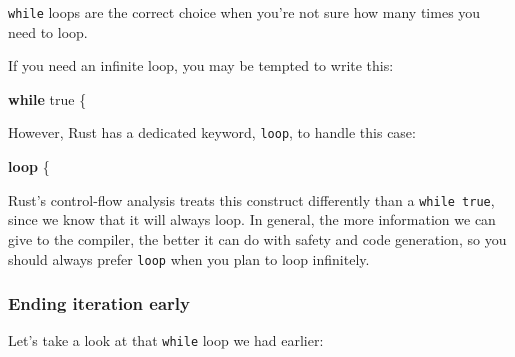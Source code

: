 \documentclass[a4paper,]{book}
\newenvironment{Shaded}{\begin{snugshade}}{\end{snugshade}}
\newcommand{\KeywordTok}[1]{\textcolor[rgb]{0.13,0.29,0.53}{\textbf{{#1}}}}
\newcommand{\DecValTok}[1]{\textcolor[rgb]{0.00,0.00,0.81}{{#1}}}
\newcommand{\ConstantTok}[1]{\textcolor[rgb]{0.00,0.00,0.00}{{#1}}}
\newcommand{\StringTok}[1]{\textcolor[rgb]{0.31,0.60,0.02}{{#1}}}
\newcommand{\PreprocessorTok}[1]{\textcolor[rgb]{0.56,0.35,0.01}{\textit{{#1}}}}
\newcommand{\NormalTok}[1]{{#1}}
\begin{document}
\texttt{while} loops are the correct choice when you're not sure how
many times you need to loop.

If you need an infinite loop, you may be tempted to write this:

\begin{Shaded}
\begin{Highlighting}[]
\KeywordTok{while} \ConstantTok{true} \NormalTok{\{}
\end{Highlighting}
\end{Shaded}

However, Rust has a dedicated keyword, \texttt{loop}, to handle this
case:

\begin{Shaded}
\begin{Highlighting}[]
\KeywordTok{loop} \NormalTok{\{}
\end{Highlighting}
\end{Shaded}

Rust's control-flow analysis treats this construct differently than a
\texttt{while\ true}, since we know that it will always loop. In
general, the more information we can give to the compiler, the better it
can do with safety and code generation, so you should always prefer
\texttt{loop} when you plan to loop infinitely.

\subsubsection{Ending iteration early}\label{ending-iteration-early}

Let's take a look at that \texttt{while} loop we had earlier:

\begin{Shaded}
\end{Shaded}
\end{document}
